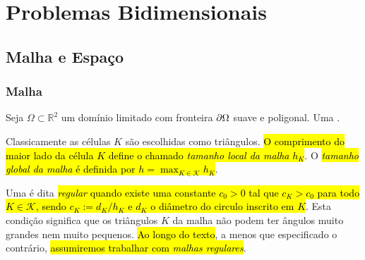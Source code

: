 
\chapter{Problemas Bidimensionais}\label{cap_mef2d}
\thispagestyle{fancy}

\section{Malha e Espaço}\label{cap_mef2d_sec_malha}
\badgeRevisar

\subsection{Malha}
\badgeRevisar

Seja $\Omega\subset \mathbb{R}^2$ um domínio limitado com fronteira $\partial\Omega$ suave e poligonal. Uma .

Classicamente as células $K$ são escolhidas como triângulos. \hl{O comprimento do maior lado da célula $K$ define o chamado \emph{tamanho local da malha} $h_K$}. O \hl{\emph{tamanho global da malha} é definida por $h = \max_{K\in\mathcal{K}} h_K$}.

Uma  é dita \hl{\emph{regular} quando existe uma constante $c_0 > 0$ tal que $c_K > c_0$ para todo $K\in\mathcal{K}$, sendo $c_K := d_K/h_K$ e $d_K$ o diâmetro do circulo inscrito em $K$}. Esta condição significa que os triângulos $K$ da malha não podem ter ângulos muito grandes nem muito pequenos. \hl{Ao longo do texto}, a menos que especificado o contrário, \hl{assumiremos trabalhar com \emph{malhas regulares}}.

